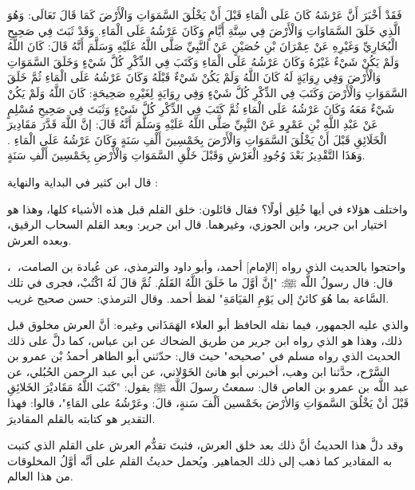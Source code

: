 فَقَدْ أَخْبَرَ أَنَّ عَرْشَهُ كَانَ عَلَى الْمَاءِ قَبْلَ أَنْ يَخْلُقَ السَّمَوَاتِ وَالْأَرْضَ كَمَا قَالَ تَعَالَى: {وَهُوَ الَّذِي خَلَقَ السَّمَاوَاتِ وَالْأَرْضَ فِي سِتَّةِ أَيَّامٍ وَكَانَ عَرْشُهُ عَلَى الْمَاءِ}. وَقَدْ ثَبَتَ فِي صَحِيحِ الْبُخَارِيِّ وَغَيْرِهِ عَنْ عِمْرَانَ بْنِ حُصَيْنٍ عَنْ النَّبِيِّ صَلَّى اللَّهُ عَلَيْهِ وَسَلَّمَ أَنَّهُ قَالَ: {كَانَ اللَّهُ وَلَمْ يَكُنْ شَيْءٌ غَيْرُهُ وَكَانَ عَرْشُهُ عَلَى الْمَاءِ وَكَتَبَ فِي الذِّكْرِ كُلَّ شَيْءٍ وَخَلَقَ السَّمَوَاتِ وَالْأَرْضَ} وَفِي رِوَايَةٍ لَهُ {كَانَ اللَّهُ وَلَمْ يَكُنْ شَيْءٌ قَبْلَهُ وَكَانَ عَرْشُهُ عَلَى الْمَاءِ ثُمَّ خَلَقَ السَّمَوَاتِ وَالْأَرْضَ وَكَتَبَ فِي الذِّكْرِ كُلَّ شَيْءٍ} وَفِي رِوَايَةٍ لِغَيْرِهِ صَحِيحَةٍ: {كَانَ اللَّهُ وَلَمْ يَكُنْ شَيْءٌ مَعَهُ وَكَانَ عَرْشُهُ عَلَى الْمَاءِ ثُمَّ كَتَبَ فِي الذِّكْرِ كُلَّ شَيْءٍ} وَثَبَتَ فِي صَحِيحِ مُسْلِمٍ عَنْ عَبْدِ اللَّهِ بْنِ عَمْرٍو عَنْ النَّبِيِّ صَلَّى اللَّهُ عَلَيْهِ وَسَلَّمَ أَنَّهُ قَالَ: {إنَّ اللَّهَ قَدَّرَ مَقَادِيرَ الْخَلَائِقِ قَبْلَ أَنْ يَخْلُقَ السَّمَوَاتِ وَالْأَرْضَ بِخَمْسِينَ أَلْفِ سَنَةٍ وَكَانَ عَرْشُهُ عَلَى الْمَاءِ} . وَهَذَا التَّقْدِيرُ بَعْدَ وُجُودِ الْعَرْشِ وَقَبْلَ خَلْقِ السَّمَوَاتِ وَالْأَرْضِ بِخَمْسِينَ أَلْفِ سَنَةٍ. 

قال ابن كثير في البداية والنهاية \href{https://shamela.ws/book/30097/106#p7}{\faExternalLink}:

واختلف هؤلاء في أيها خُلِق أولًا؟ فقال قائلون: خلق القلم قبل هذه الأشياء كلها، وهذا هو اختيار ابن جرير، وابن الجوزي، وغيرهما. قال ابن جرير: وبعد القلم السحاب الرقيق، وبعده العرش.

واحتجوا بالحديث الذي رواه [الإمام] أحمد، وأبو داود والترمذي، عن عُبادة بن الصامت، ﵁، قال: قال رسولُ اللَّه ﷺ: "إنَّ أوَّلَ ما خَلَقَ اللَّهُ القَلَمُ. ثُمَّ قالَ لَهُ اكْتُبْ، فجرى في تلك السَّاعة بما هُوَ كائنٌ إلى يَوْمِ القيَامَةِ" لفظ أحمد. وقال الترمذي: حسن صحيح غريب.

والذي عليه الجمهور، فيما نقله الحافظ أبو العلاء الهَمَذَاني وغيره: أنَّ العرش مخلوق قبل ذلك، وهذا هو الذي رواه ابن جرير من طريق الضحاك عن ابن عباس، كما دلَّ على ذلك الحديث الذي رواه مسلم في "صحيحه" حيث قال: حدّثني أبو الطاهر أحمدُ بْن عمرو بن السَّرْح، حدَّثنا ابن وهب، أخبرني أبو هانئ الخَوْلاني، عن أبي عبد الرحمن الحُبُلي، عن عبد اللَّه بن عمرو بن العاص قال: سمعتُ رسولَ اللَّه ﷺ يقول: "كَتَبَ اللَّهُ مَقَاديْرَ الخَلائِقِ قَبْلَ أنْ يَخْلُقَ السَّموَاتِ وَالأرْضَ بخَمْسين ألْفَ سَنةٍ، قالَ: وعَرْشُهُ على المَاءِ"، قالوا: فهذا التقدير هو كتابته بالقلم المقاديرَ.

وقد دلَّ هذا الحديثُ أنَّ ذلك بعد خلق العرش، فثبتَ تقدُّم العرش على القلم الذي كتبت به المقادير كما ذهب إلى ذلك الجماهير. ويُحمل حديثُ القلم على أنَّه أوَّلُ المخلوقات من هذا العالم.

